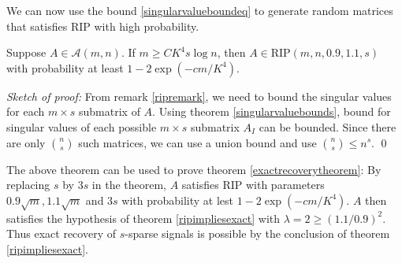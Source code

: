 We can now use the bound \eqref{singularvalueboundeq} to
generate random matrices that satisfies RIP with high probability.

\begin{theorem}\label{randomripprop}
	Suppose $A\in\mathcal{A}(m, n)$. If $m\geq CK^4 s\log n$, then
	$A\in \mbox{RIP}(m, n, 0.9, 1.1, s)$ with probability
	at least $1-2\exp({-cm}/{K^4})$.
\end{theorem}
\noindent
\textit{Sketch of proof:}
	From remark \ref{ripremark}, we need to bound the singular values
	for each $m\times s$ submatrix of $A$.
	Using theorem \ref{singularvaluebounds}, bound for singular
	values of each possible $m\times s$ submatrix $A_I$ can
	be bounded. Since there are only $\binom{n}{s}$ such matrices,
	we can use a union bound and use $\binom{n}{s}\leq n^s$.
	\qed
\indent

\begin{remark}
	The above theorem can be used to prove theorem
	\ref{exactrecoverytheorem}: By replacing $s$ by $3s$
	in the theorem, $A$ satisfies RIP with parameters
	$0.9\sqrt{m}, 1.1\sqrt{m}$ and $3s$ with probability
	at lest $1-2\exp(-cm/K^4)$. 
	$A$ then satisfies the hypothesis of theorem
	\ref{ripimpliesexact} with $\lambda = 2\geq (1.1/0.9)^2$.
	Thus exact recovery of $s$-sparse signals is possible by
	the conclusion of theorem \ref{ripimpliesexact}.
\end{remark}

